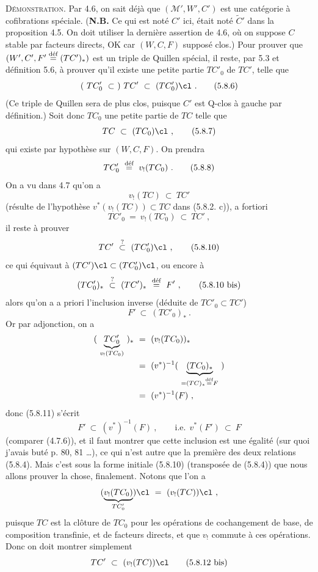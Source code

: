 \textsc{Démonstration}. Par 4.6, on sait déjà que $(\mathcal{M}', W', C')$ est une catégorie à cofibrations spéciale. (\textbf{N.B.} Ce qui est noté $C'$ ici, était noté $\tilde{C}'$ dans la proposition 4.5. On doit utiliser la dernière assertion de 4.6, où on suppose $C$ stable par facteurs directs, OK car $(W, C, F)$ supposé clos.) Pour prouver que $(W', C', F' \defeq (TC')_*)$ est un triple de Quillen
spécial, il reste, par 5.3 et définition 5.6, à prouver qu'il existe une petite partie $TC'_0$ de $TC'$, telle que
\[
(\ TC'_0 \ \subset\ )\ TC' \ \subset \ (TC'_0)\cl\ .
\tag*{(5.8.6)}
\]
(Ce triple de Quillen sera de plus clos, puisque $C'$ est Q-clos à gauche par définition.) Soit donc $TC_0$ une petite partie de $TC$ telle que
\[
TC \ \subset \ (TC_0)\cl\ ,
\tag*{(5.8.7)}
\]
qui existe par hypothèse sur $(W, C, F)$. On prendra
\[
TC'_0 \ \defeq \ v_!(TC_0)\ .
\tag*{(5.8.8)}
\]
On a vu dans 4.7 qu'on a
\[
v_!(TC) \ \subset \ TC'
\tag*{(5.8.9)}
\]
(résulte de l'hypothèse $v^*(v_!(TC)) \subset TC$ dans (5.8.2. c)), a fortiori
\[
TC'_0 \ = \ v_!(TC_0) \ \subset \ TC'\ ,
\]
il reste à prouver
\[
TC' \ \overset{?}{\subset} \ (TC'_0)\cl\ ,
\tag*{(5.8.10)}
\]
ce qui équivaut à $(TC')\cl \subset (TC'_0)\cl$, ou encore à
\[
(TC'_0)_* \ \overset{?}{\subset} \ (TC')_* \ \defeq \ F'\ ,
\tag*{(5.8.10 bis)}
\]
alors qu'on a a priori l'inclusion inverse (déduite de $TC'_0 \subset TC'$)
\[
F' \ \subset \ (TC'_0)_*\ .
\tag*{(5.8.11)}
\]
Or par adjonction, on a
\[
\begin{aligned}
(\ \underbrace{TC'_0}_{v_!(TC_0)}\ )_* \ &= \ (v_!(TC_0))_*\\
&= \ (v^*)^{-1}(\ \underbrace{(TC_0)_*}_{= (TC)_* \defeq F}\ )\\
&= \ (v^*)^{-1}(F)\ ,
\end{aligned}
\]
donc (5.8.11) s'écrit
\[
F' \ \subset \ (v^*)^{-1}(F)\ , \qquad \text{i.e.}\ \ v^*(F') \ \subset \ F
\tag*{(5.8.12)}
\]
(comparer (4.7.6)), et il faut montrer que cette inclusion est une égalité (sur quoi j'avais buté p. 80, 81 \ldots), ce qui n'est autre que la première des deux relations (5.8.4). Mais c'est sous la forme initiale (5.8.10) (transposée de (5.8.4)) que nous allons prouver la chose, finalement. Notons que l'on a
\[
(\underbrace{v_!(TC_0)}_{TC'_0})\cl \ = \ (v_!(TC))\cl\ ,
\]
puisque $TC$ est la clôture de $TC_0$ pour les opérations de cochangement de base, de composition transfinie, et de facteurs directs, et que $v_!$ commute à ces opérations. Donc on doit montrer simplement
\[
TC' \ \subset \ (v_!(TC))\cl
\tag*{(5.8.12 bis)}
\]
